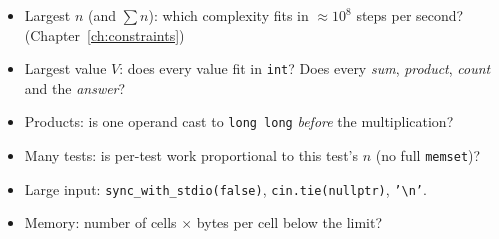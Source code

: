 \begin{checklistbox}
\begin{itemize}[leftmargin=*]
    \item[$\square$] Largest $n$ (and $\sum n$): which complexity fits in $\approx 10^8$ steps per second? (Chapter~\ref{ch:constraints})
    \item[$\square$] Largest value $V$: does every value fit in \texttt{int}? Does every \emph{sum}, \emph{product}, \emph{count} and the \emph{answer}?
    \item[$\square$] Products: is one operand cast to \texttt{long long} \emph{before} the multiplication?
    \item[$\square$] Many tests: is per-test work proportional to this test's $n$ (no full \texttt{memset})?
    \item[$\square$] Large input: \texttt{sync\_with\_stdio(false)}, \texttt{cin.tie(nullptr)}, \texttt{'\textbackslash n'}.
    \item[$\square$] Memory: number of cells $\times$ bytes per cell below the limit?
\end{itemize}
\end{checklistbox}
